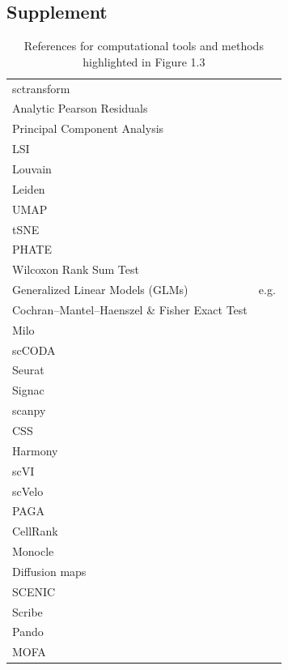 \clearpage

\subsection{Supplement}
\beginsupplement

\begin{table}[H]
  \caption{References for computational tools and methods highlighted in Figure 1.3}
  \begin{tabular}{l|l}
    sctransform & \cite{hafemeister_normalization_2019} \\
    Analytic Pearson Residuals & \cite{lause_analytic_2021} \\
    Principal Component Analysis & \cite{wolf_scanpy_2018,stuart_comprehensive_2019} \\
    LSI & \cite{stuart_multimodal_2020} \\
    Louvain & \cite{blondel_fast_2008} \\
    Leiden & \cite{traag_louvain_2019} \\
    UMAP & \cite{mcinnes_umap_2018} \\
    tSNE & \cite{maaten_visualizing_2008} \\
    PHATE & \cite{moon_visualizing_2019} \\
    Wilcoxon Rank Sum Test & \cite{bauer_constructing_1972,korsunsky_presto_2019} \\
    Generalized Linear Models (GLMs) & e.g. \cite{friedman_regularization_2010} \\
    Cochran–Mantel–Haenszel \& Fisher Exact Test & \cite{fisher_logic_1935} \\
    Milo & \cite{dann_differential_2022} \\
    scCODA & \cite{buttner_sccoda_2021} \\
    Seurat & \cite{stuart_comprehensive_2019} \\
    Signac & \cite{stuart_multimodal_2020} \\
    scanpy & \cite{wolf_scanpy_2018} \\
    CSS & \cite{he_css_2020} \\
    Harmony & \cite{korsunsky_fast_2019} \\
    scVI & \cite{lopez_deep_2018} \\
    scVelo & \cite{bergen_generalizing_2020} \\
    PAGA & \cite{wolf_scanpy_2018} \\
    CellRank & \cite{lange_cellrank_2022} \\
    Monocle & \cite{trapnell_dynamics_2014} \\
    Diffusion maps & \cite{haghverdi_diffusion_2016} \\
    SCENIC & \cite{aibar_scenic_2017} \\
    Scribe & \cite{qiu_inferring_2020} \\
    Pando & \cite{fleck_inferring_2021} \\
    MOFA & \cite{argelaguet_multi-omics_2019}
  \end{tabular}
\end{table}
